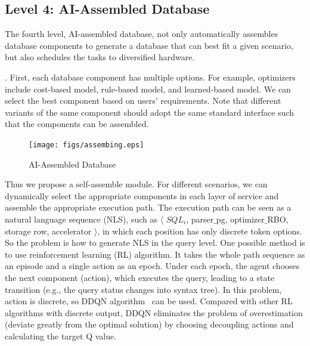 

\subsection{Level 4: AI-Assembled Database}
\label{subsec: assemble}

The fourth level, AI-assembled database, not only automatically assembles database components to generate a database that can best fit a given scenario, but also schedules the tasks to diversified hardware. 



. First, each database component has multiple options. For example, optimizers include cost-based model, rule-based model, and learned-based model. We can select the best component based on users' requirements. Note that different variants of the same component should adopt the same standard interface such that the components can be assembled. 

\begin{figure}
\vspace{-2em}
  \begin{center}
    \texttt{[image: figs/assembing.eps]}
  \end{center}
\vspace{-3em}
\caption{AI-Assembled Database}
\label{fig:assemble}
\vspace{-1em}
\end{figure}



Thus we propose a self-assemble module. For different scenarios, we can dynamically select the appropriate components in each layer of service and assemble the appropriate execution path.
The execution path can be seen as a natural language sequence (NLS), such as $\langle$ $SQL_i$, parser$\_$pg, optimizer$\_$RBO, storage row, accelerator $\rangle$, in which each position has only discrete token options. So the problem is how to generate NLS in the query level. One possible method is to use reinforcement learning (RL)  algorithm. It takes the whole path sequence as an episode and a single action as an epoch. Under each epoch, the agent chooses the next component (action), which executes the query, leading to a state transition (e.g., the query status changes into syntax tree). In this problem, action is discrete, so DDQN algorithm~\cite{DBLP:conf/aaai/HasseltGS16} can be used. Compared with other RL algorithms with discrete output, DDQN eliminates the problem of overestimation (deviate greatly from the optimal solution) by choosing decoupling actions and calculating the target Q value.




